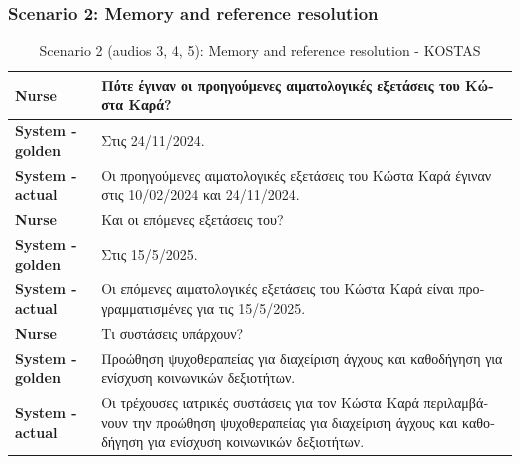 \subsubsection{Scenario 2: Memory and reference resolution}
\begin{table}[H]
\centering
\renewcommand{\arraystretch}{1.5} 
\begin{tabular}{|>{\bfseries}l|p{11cm}|}
\hline
Nurse & \textgreek{Πότε έγιναν οι προηγούμενες αιματολογικές εξετάσεις του Κώστα Καρά?} \\
\hline
System - golden & \textgreek{Στις 24/11/2024.} \\
\hline
System - actual & \textgreek{Οι προηγούμενες αιματολογικές εξετάσεις του Κώστα Καρά έγιναν στις 10/02/2024 και 24/11/2024.} \\
\hline
Nurse & \textgreek{Και οι επόμενες εξετάσεις του?} \\
\hline
System - golden & \textgreek{Στις 15/5/2025.} \\
\hline
System - actual & \textgreek{Οι επόμενες αιματολογικές εξετάσεις του Κώστα Καρά είναι προγραμματισμένες για τις 15/5/2025.} \\
\hline
Nurse & \textgreek{Τι συστάσεις υπάρχουν?} \\
\hline
System - golden & \textgreek{Προώθηση ψυχοθεραπείας για διαχείριση άγχους και καθοδήγηση για ενίσχυση κοινωνικών δεξιοτήτων.} \\
\hline
System - actual & \textgreek{Οι τρέχουσες ιατρικές συστάσεις για τον Κώστα Καρά περιλαμβάνουν την προώθηση ψυχοθεραπείας για διαχείριση άγχους και καθοδήγηση για ενίσχυση κοινωνικών δεξιοτήτων.} \\
\hline
\end{tabular}
\caption{Scenario 2 (audios 3, 4, 5): Memory and reference resolution - KOSTAS}
\end{table}

